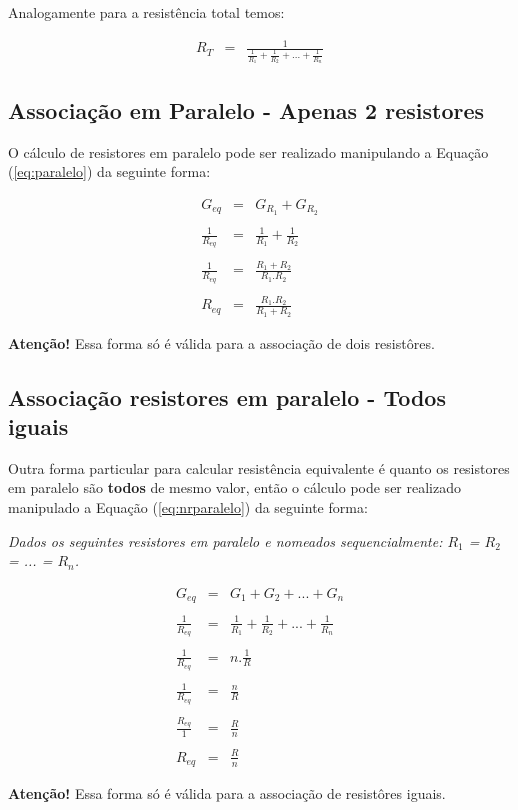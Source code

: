 Analogamente para a resistência total temos:

\begin{eqnarray}
	\label{eq:nrparalelo}
	R_T & = & \frac{1}{\frac{1}{R_1} + \frac{1}{R_2} + ... + \frac{1}{R_n} }
\end{eqnarray}


\subsection{Associação em Paralelo - Apenas 2 resistores}

O cálculo de resistores em paralelo pode ser realizado manipulando a Equação (\ref{eq:paralelo}) da seguinte forma:

\begin{eqnarray}
	G_{eq} & = & G_{R_1} + G_{R_2} \nonumber\\
	\nonumber\\
	\frac{1}{R_{eq}}	& = & \frac{1}{R_1} + \frac{1}{R_2} \nonumber\\
	\nonumber\\
	\frac{1}{R_{eq}}	& = & \frac{R_1 + R_2}{R_1.R_2} \nonumber\\
	\nonumber\\
	R_{eq}	& = & \frac{R_1.R_2}{R_1 + R_2} \nonumber
\end{eqnarray}

\textbf{Atenção!} Essa forma só é válida para a associação de dois resistôres.


\subsection{Associação resistores em paralelo - Todos iguais}

Outra forma particular para calcular resistência equivalente é quanto os resistores em paralelo são \textbf{todos} de mesmo valor, então o cálculo pode ser realizado manipulado a Equação (\ref{eq:nrparalelo}) da seguinte forma:

\textit{Dados os seguintes resistores em paralelo e nomeados sequencialmente: $R_1$ = $R_2$ = ... = $R_n$. }

\begin{eqnarray}
	G_{eq} & = & G_1 + G_2 + ... + G_n \nonumber\\
	\nonumber\\
	\frac{1}{R_{eq}} & = & \frac{1}{R_1} + \frac{1}{R_2} + ... + \frac{1}{R_n}\nonumber\\
	\nonumber\\
	\frac{1}{R_{eq}} & = & n.\frac{1}{R} \nonumber\\
	\nonumber\\
	\frac{1}{R_{eq}} & = & \frac{n}{R} \nonumber\\
	\nonumber\\
	\frac{R_{eq}}{1} & = & \frac{R}{n} \nonumber\\
	\nonumber\\
	R_{eq} & = & \frac{R}{n}
\end{eqnarray}

\textbf{Atenção!} Essa forma só é válida para a associação de resistôres iguais.
